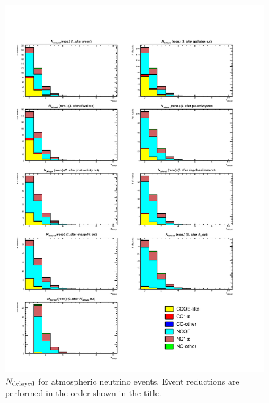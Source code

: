\begin{figure}[h]
	\centering
	\includegraphics[width=15cm]{PDF/Dist_ATM/Che_50deg_tag_ge1/All/RecoNumCap}
	\caption[$N_{\rm delayed}$ for atmospheric neutrino events]{
	$N_{\rm delayed}$ for atmospheric neutrino events.
	Event reductions are performed in the order shown in the title.
	}\label{ATM_RecoNumCap}
\end{figure}

